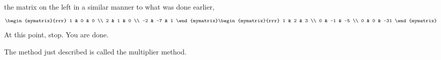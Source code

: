\begin{solution}
the matrix on the left in a similar manner to what was done earlier, 
\begin{equation*}
\begin{mymatrix}{rrr}
1 & 0 & 0 \\ 
2 & 1 & 0 \\ 
-2 & -7 & 1
\end{mymatrix} \begin{mymatrix}{rrr}
1 & 2 & 3 \\ 
0 & -1 & -5 \\ 
0 & 0 & -31
\end{mymatrix}
\end{equation*}
At this point, stop. You are done. 
\end{solution}

The method just described is called the
multiplier method.
